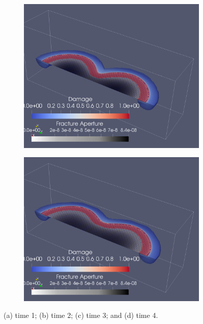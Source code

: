 \begin{figure}[h]
\bigskip
\begin{subfigure}{.45\textwidth}
  \centering
  \includegraphics[width=\linewidth]{Chapter4/figures/merging/merge_t_45(1).png}
  \caption{}
  \label{fig:merge_t_4}
\end{subfigure}
\hspace{0.85cm}
\begin{subfigure}{.45\textwidth}
  \centering
  \includegraphics[width=\linewidth]{Chapter4/figures/merging/merge_t_67(1).png}
  \caption{}
  \label{fig:merge_t_5}
\end{subfigure}
  \caption{(a) time 1; (b) time 2; (c) time 3; and (d) time 4. } 
  \label{fig:merge_snapshots}  
\end{figure}

